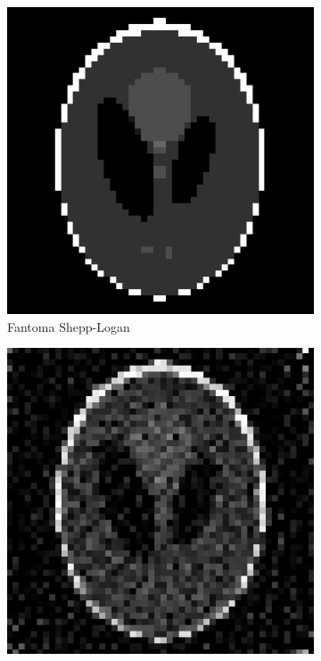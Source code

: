 \documentclass[letterpaper,12pt]{article}
\theoremstyle{plain}
\begin{document}
\begin{figure}[H]
   \centering
      \begin{subfigure}[h]{0.32\linewidth}
         \centering
         \includegraphics[width=\textwidth]{Figuras/exact_phantom.png}
         \caption{Fantoma Shepp-Logan} 
         \label{fig:exact_phantom}
      \end{subfigure}
        \begin{subfigure}[h]{0.32\linewidth}
           \centering
           \includegraphics[width=\textwidth]{Figuras/Kaczmarz_rec.png}

\end{subfigure}
\end{figure}
\end{document}

